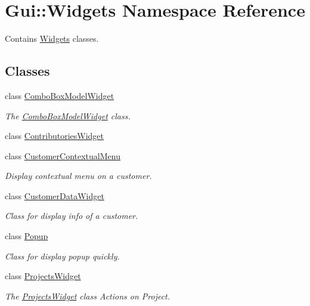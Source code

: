 \hypertarget{namespaceGui_1_1Widgets}{\section{Gui\+:\+:Widgets Namespace Reference}
\label{namespaceGui_1_1Widgets}
}


Contains \hyperlink{namespaceGui_1_1Widgets}{Widgets} classes.  


\subsection*{Classes}
\begin{DoxyCompactItemize}
\item 
class \hyperlink{classGui_1_1Widgets_1_1ComboBoxModelWidget}{Combo\+Box\+Model\+Widget}
\begin{DoxyCompactList}\small\item\em The \hyperlink{classGui_1_1Widgets_1_1ComboBoxModelWidget}{Combo\+Box\+Model\+Widget} class. \end{DoxyCompactList}\item 
class \hyperlink{classGui_1_1Widgets_1_1ContributoriesWidget}{Contributories\+Widget}
\item 
class \hyperlink{classGui_1_1Widgets_1_1CustomerContextualMenu}{Customer\+Contextual\+Menu}
\begin{DoxyCompactList}\small\item\em Display contextual menu on a customer. \end{DoxyCompactList}\item 
class \hyperlink{classGui_1_1Widgets_1_1CustomerDataWidget}{Customer\+Data\+Widget}
\begin{DoxyCompactList}\small\item\em Class for display info of a customer. \end{DoxyCompactList}\item 
class \hyperlink{classGui_1_1Widgets_1_1Popup}{Popup}
\begin{DoxyCompactList}\small\item\em Class for display popup quickly. \end{DoxyCompactList}\item 
class \hyperlink{classGui_1_1Widgets_1_1ProjectsWidget}{Projects\+Widget}
\begin{DoxyCompactList}\small\item\em The \hyperlink{classGui_1_1Widgets_1_1ProjectsWidget}{Projects\+Widget} class Actions on Project. \end{DoxyCompactList}\item 

\end{DoxyCompactItemize}
